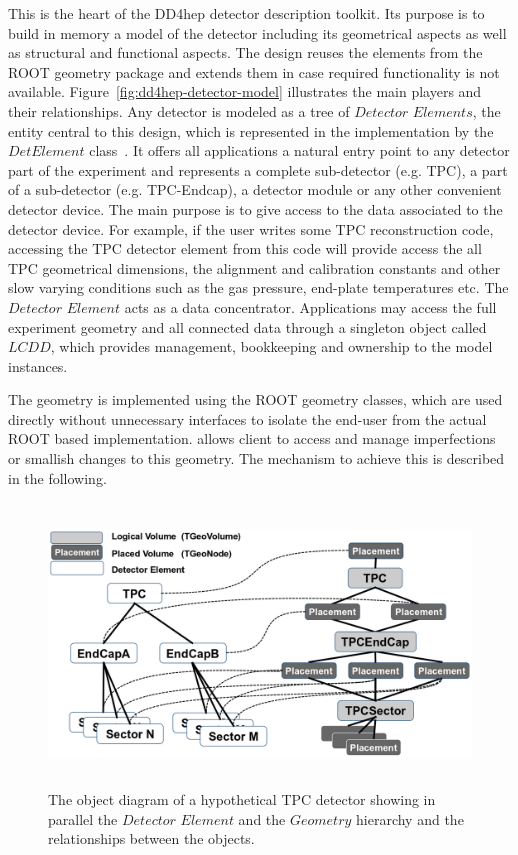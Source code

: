 \documentclass[10pt,a4paper]{article}
\begin{document}
\noindent
This is the heart of the DD4hep detector description toolkit. Its purpose is 
to build in memory a model of the detector including its geometrical aspects
as well as structural and functional aspects. The design reuses the elements 
from the ROOT geometry package and extends them in case required functionality 
is not available. Figure~\ref{fig:dd4hep-detector-model} illustrates the main
players and their relationships.
Any detector is modeled as a tree of $Detector$ $Elements$, the entity 
central to this design, which is represented in the implementation by 
the $DetElement$ class~\cite{bib:LHCb-geometry}. It offers all
applications a natural entry point to any detector part of the experiment
and represents a complete sub-detector (e.g. TPC), a part of a 
sub-detector (e.g. TPC-Endcap), a detector module or any other convenient 
detector device. 
The main purpose is to give access to the data associated 
to the detector device. For example, if the user writes some TPC reconstruction 
code, accessing the TPC detector element from this code will provide access 
the all TPC geometrical dimensions, the alignment and calibration constants 
and other slow varying conditions such as the gas pressure, end-plate 
temperatures etc. The $Detector$ $Element$ acts as a data concentrator. 
Applications may access the full experiment geometry and all connected data
through a singleton object called $LCDD$, which provides 
management, bookkeeping and ownership to the model instances.

\noindent
The geometry is implemented using the ROOT geometry classes, which are used
directly without unnecessary interfaces to isolate the end-user from the 
actual ROOT based implementation.
\DDA allows client to access and manage imperfections or smallish changes 
to this geometry. The mechanism to achieve this is described in the following.

\begin{figure}[t]
  \begin{center}
    \includegraphics[height=75mm] {DD4hep_detelement_tree.png}
    \caption{The object diagram of a hypothetical TPC detector showing in
    parallel the $Detector$ $Element$ and the $Geometry$ hierarchy and the 
    relationships between the objects.}
    \label{fig:dd4hep-hierarchies}
  \end{center}
  \vspace{-0.5cm}
\end{figure}
\end{document}

